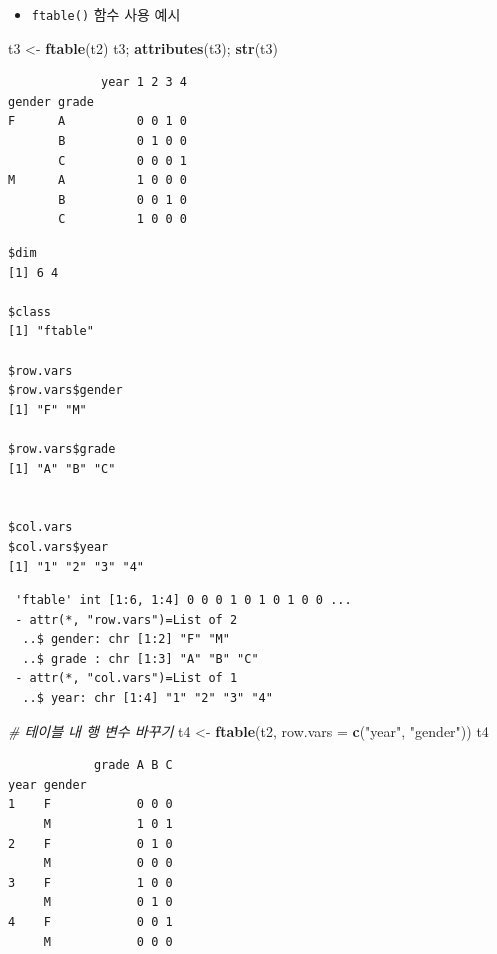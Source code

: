 \documentclass[
  11pt,
]{krantz}
\newenvironment{Shaded}{\begin{snugshade}}{\end{snugshade}}
\newcommand{\CommentTok}[1]{\textcolor[rgb]{0.37,0.37,0.37}{\textit{#1}}}
\newcommand{\DataTypeTok}[1]{\textcolor[rgb]{0.27,0.27,0.27}{#1}}
\newcommand{\KeywordTok}[1]{\textcolor[rgb]{0.27,0.27,0.27}{\textbf{#1}}}
\newcommand{\NormalTok}[1]{#1}
\newcommand{\StringTok}[1]{\textcolor[rgb]{0.5,0.5,0.5}{#1}}
\providecommand{\tightlist}{%
  \setlength{\itemsep}{0pt}\setlength{\parskip}{0pt}}
\begin{document}
\normalsize

\begin{itemize}
\tightlist
\item
  \texttt{ftable()} 함수 사용 예시
\end{itemize}

\footnotesize

\begin{Shaded}
\begin{Highlighting}[]
\NormalTok{t3 <-}\StringTok{ }\KeywordTok{ftable}\NormalTok{(t2)}
\NormalTok{t3; }\KeywordTok{attributes}\NormalTok{(t3); }\KeywordTok{str}\NormalTok{(t3)}
\end{Highlighting}
\end{Shaded}

\begin{verbatim}
             year 1 2 3 4
gender grade             
F      A          0 0 1 0
       B          0 1 0 0
       C          0 0 0 1
M      A          1 0 0 0
       B          0 0 1 0
       C          1 0 0 0
\end{verbatim}

\begin{verbatim}
$dim
[1] 6 4

$class
[1] "ftable"

$row.vars
$row.vars$gender
[1] "F" "M"

$row.vars$grade
[1] "A" "B" "C"


$col.vars
$col.vars$year
[1] "1" "2" "3" "4"
\end{verbatim}

\begin{verbatim}
 'ftable' int [1:6, 1:4] 0 0 0 1 0 1 0 1 0 0 ...
 - attr(*, "row.vars")=List of 2
  ..$ gender: chr [1:2] "F" "M"
  ..$ grade : chr [1:3] "A" "B" "C"
 - attr(*, "col.vars")=List of 1
  ..$ year: chr [1:4] "1" "2" "3" "4"
\end{verbatim}

\begin{Shaded}
\begin{Highlighting}[]
\CommentTok{# 테이블 내 행 변수 바꾸기}
\NormalTok{t4 <-}\StringTok{ }\KeywordTok{ftable}\NormalTok{(t2, }\DataTypeTok{row.vars =} \KeywordTok{c}\NormalTok{(}\StringTok{"year"}\NormalTok{, }\StringTok{"gender"}\NormalTok{))}
\NormalTok{t4}
\end{Highlighting}
\end{Shaded}

\begin{verbatim}
            grade A B C
year gender            
1    F            0 0 0
     M            1 0 1
2    F            0 1 0
     M            0 0 0
3    F            1 0 0
     M            0 1 0
4    F            0 0 1
     M            0 0 0
\end{verbatim}
\end{document}
